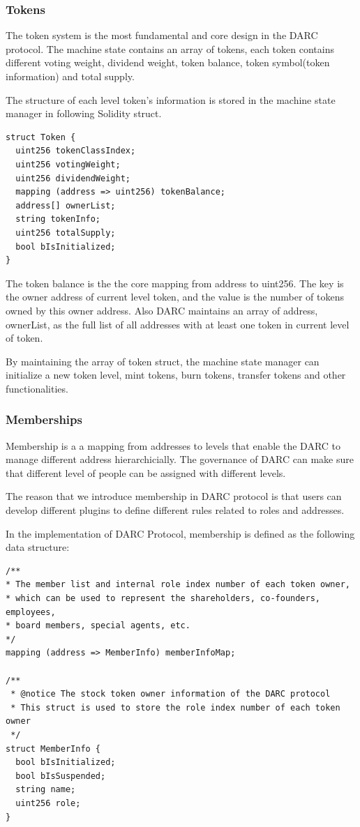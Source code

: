 \documentclass[main.tex]{subfiles}
\begin{document}
\subsubsection{Tokens}

The token system is the most fundamental and core design in the DARC protocol. The machine state contains an array of tokens, each token contains different voting weight, dividend weight, token balance, token symbol(token information) and total supply.

The structure of each level token's information is stored in the machine state manager in following Solidity struct.

\begin{verbatim}
struct Token {
  uint256 tokenClassIndex;
  uint256 votingWeight;
  uint256 dividendWeight;
  mapping (address => uint256) tokenBalance;
  address[] ownerList;
  string tokenInfo;
  uint256 totalSupply;
  bool bIsInitialized;
}
\end{verbatim}

The token balance is the the core mapping from address to uint256. The key is the owner address of current level token, and the value is the number of tokens owned by this owner address. Also DARC maintains an array of address, ownerList, as the full list of all addresses with at least one token in current level of token.

By maintaining the array of token struct, the machine state manager can initialize a new token level, mint tokens, burn tokens, transfer tokens and other functionalities.

\subsubsection{Memberships}

Membership is a a mapping from addresses to levels that enable the DARC to manage different address hierarchicially. The governance of DARC can make sure that different level of people can be assigned with different levels.

The reason that we introduce membership in DARC protocol is that users can develop different plugins to define different rules related to roles and addresses.

In the implementation of DARC Protocol, membership is defined as the following data structure:

\begin{verbatim}
/**
* The member list and internal role index number of each token owner,
* which can be used to represent the shareholders, co-founders, employees, 
* board members, special agents, etc.
*/
mapping (address => MemberInfo) memberInfoMap;

/**
 * @notice The stock token owner information of the DARC protocol
 * This struct is used to store the role index number of each token owner
 */
struct MemberInfo {
  bool bIsInitialized;
  bool bIsSuspended;
  string name;
  uint256 role;
}
\end{verbatim}
\end{document}
